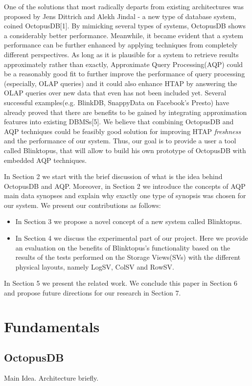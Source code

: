 \documentclass[10pt, conference, compsocconf]{IEEEtran}
\begin{document}
One of the solutions that most radically departs from existing architectures was proposed by Jens Dittrich and Alekh Jindal - a new type of database system, coined OctopusDB[1]. By mimicking several types of systems, OctopusDB shows a considerably better performance. Meanwhile, it became evident that a system performance can be further enhanced by applying techniques from completely different perspectives. As long as it is plausible for a system to retrieve results approximately rather than exactly, Approximate Query Processing(AQP) could be a reasonably good fit to further improve the performance of query processing (especially, OLAP queries) and it could also enhance HTAP by answering the OLAP queries over new data that even has not been included yet. Several successful examples(e.g. BlinkDB, SnappyData on Facebook's Presto) have already proved that there are benefits to be gained by integrating approximation features into existing DBMSs[5]. We believe that combining OctopusDB and AQP techniques could be feasibly good solution for improving HTAP \textit{freshness} and the performance of our system. 
Thus, our goal is to provide a user a tool called Blinktopus, that will allow  to build his own prototype of OctopusDB with embedded AQP techniques.

In Section 2 we start with the brief discussion of what is the idea behind OctopusDB and AQP. Moreover, in Section 2 we introduce the concepts of AQP main data synopses and explain why exactly one type of synopsis was chosen for our system. We present our contributions as follows:
\begin{itemize}
\vspace{0.05 cm}
\item{In Section 3 we propose a novel concept of a new system called Blinktopus.}
\item{In Section 4 we discuss the experimental part of our project. Here we provide an evaluation on the benefits of Blinktopus's functionality based on the results of the tests performed on the Storage Views(SVs) with the different physical layouts, namely LogSV, ColSV and RowSV.}
\end{itemize}
In Section 5 we present the related work. We conclude this paper in Section 6 and propose future directions for our research in Section 7.

\section{Fundamentals}
\subsection{OctopusDB}
Main Idea. Architecture briefly.
\end{document}
